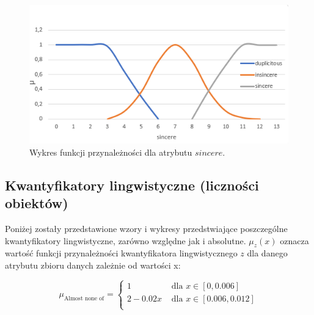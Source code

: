 \documentclass{classrep}
\begin{document}
\begin{enumerate}
  
  \begin{figure}[H]
    \includegraphics{fp_sv2.png}
    \caption{Wykres funkcji przynależności dla atrybutu \(sincere\).}
    \end{figure}

\end{enumerate}



\subsection{Kwantyfikatory lingwistyczne (liczności obiektów)}

Poniżej zostały przedstawione wzory i wykresy przedstwiające poszczególne kwantyfikatory lingwistyczne, zarówno względne jak i absolutne. 
\( \mu_z(x) \) oznacza wartość funkcji przynależności kwantyfikatora lingwistycznego \(z\) dla danego atrybutu zbioru danych zależnie od wartości x:

 \begin{equation}
    \mu_{\text{Almost none of}} = 
    \begin{cases}
        1 & \text{ dla } x \in [0,0.006] \\
        2 - 0.02x & \text{ dla } x \in [0.006,0.012] \\
      \end{cases}
  \end{equation}
\end{document}
